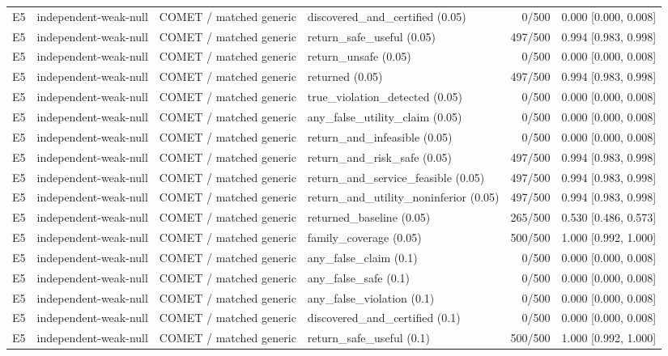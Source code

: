 \begin{longtable}{p{.04\linewidth}p{.18\linewidth}p{.19\linewidth}p{.16\linewidth}r p{.21\linewidth}}
E5 & independent-weak-null & COMET / matched generic & discovered\_and\_certified (0.05) & 0/500 & 0.000 [0.000, 0.008]\\
E5 & independent-weak-null & COMET / matched generic & return\_safe\_useful (0.05) & 497/500 & 0.994 [0.983, 0.998]\\
E5 & independent-weak-null & COMET / matched generic & return\_unsafe (0.05) & 0/500 & 0.000 [0.000, 0.008]\\
E5 & independent-weak-null & COMET / matched generic & returned (0.05) & 497/500 & 0.994 [0.983, 0.998]\\
E5 & independent-weak-null & COMET / matched generic & true\_violation\_detected (0.05) & 0/500 & 0.000 [0.000, 0.008]\\
E5 & independent-weak-null & COMET / matched generic & any\_false\_utility\_claim (0.05) & 0/500 & 0.000 [0.000, 0.008]\\
E5 & independent-weak-null & COMET / matched generic & return\_and\_infeasible (0.05) & 0/500 & 0.000 [0.000, 0.008]\\
E5 & independent-weak-null & COMET / matched generic & return\_and\_risk\_safe (0.05) & 497/500 & 0.994 [0.983, 0.998]\\
E5 & independent-weak-null & COMET / matched generic & return\_and\_service\_feasible (0.05) & 497/500 & 0.994 [0.983, 0.998]\\
E5 & independent-weak-null & COMET / matched generic & return\_and\_utility\_noninferior (0.05) & 497/500 & 0.994 [0.983, 0.998]\\
E5 & independent-weak-null & COMET / matched generic & returned\_baseline (0.05) & 265/500 & 0.530 [0.486, 0.573]\\
E5 & independent-weak-null & COMET / matched generic & family\_coverage (0.05) & 500/500 & 1.000 [0.992, 1.000]\\
E5 & independent-weak-null & COMET / matched generic & any\_false\_claim (0.1) & 0/500 & 0.000 [0.000, 0.008]\\
E5 & independent-weak-null & COMET / matched generic & any\_false\_safe (0.1) & 0/500 & 0.000 [0.000, 0.008]\\
E5 & independent-weak-null & COMET / matched generic & any\_false\_violation (0.1) & 0/500 & 0.000 [0.000, 0.008]\\
E5 & independent-weak-null & COMET / matched generic & discovered\_and\_certified (0.1) & 0/500 & 0.000 [0.000, 0.008]\\
E5 & independent-weak-null & COMET / matched generic & return\_safe\_useful (0.1) & 500/500 & 1.000 [0.992, 1.000]\\

\end{longtable}
